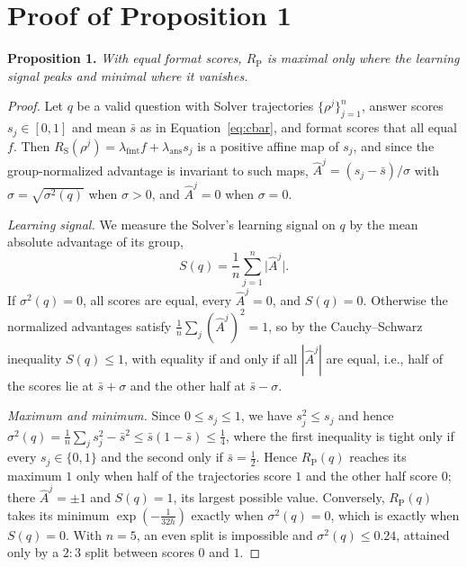 \newcommand{\casebox}[2]{\par\noindent{\setlength{\fboxsep}{1pt}\colorbox{#1}{\parbox{\dimexpr\linewidth-2\fboxsep\relax}{\raggedright\fontsize{6}{6.5}\selectfont #2}}}\par}
\section{Proof of Proposition 1}
\label{app:proof}
\textbf{Proposition 1.} \textit{With equal format scores, $R_{\mathrm{P}}$ is maximal only where the learning signal peaks and minimal where it vanishes.}\vspace{-2mm}
\begin{proof}
Let $q$ be a valid question with Solver trajectories $\{\rho^{j}\}_{j=1}^{n}$, answer scores $s_j\in[0,1]$ and mean $\bar{s}$ as in Equation~\ref{eq:cbar}, and format scores that all equal $f$. Then $R_{\mathrm{S}}(\rho^{j})=\lambda_{\mathrm{fmt}}f+\lambda_{\mathrm{ans}}s_j$ is a positive affine map of $s_j$, and since the group-normalized advantage is invariant to such maps, $\hat{A}^{j}=(s_j-\bar{s})/\sigma$ with $\sigma=\sqrt{\sigma^{2}(q)}$ when $\sigma>0$, and $\hat{A}^{j}=0$ when $\sigma=0$.

\emph{Learning signal.} We measure the Solver's learning signal on $q$ by the mean absolute advantage of its group,
\begin{equation}
\label{eq:signal}
S(q)=\frac1n\sum_{j=1}^{n}\bigl|\hat{A}^{j}\bigr|.
\end{equation}
If $\sigma^{2}(q)=0$, all scores are equal, every $\hat{A}^{j}=0$, and $S(q)=0$. Otherwise the normalized advantages satisfy $\frac1n\sum_{j}(\hat{A}^{j})^{2}=1$, so by the Cauchy--Schwarz inequality $S(q)\le1$, with equality if and only if all $|\hat{A}^{j}|$ are equal, i.e., half of the scores lie at $\bar{s}+\sigma$ and the other half at $\bar{s}-\sigma$.

\emph{Maximum and minimum.} Since $0\le s_j\le1$, we have $s_j^{2}\le s_j$ and hence $\sigma^{2}(q)=\frac1n\sum_{j}s_j^{2}-\bar{s}^{2}\le\bar{s}(1-\bar{s})\le\tfrac14$, where the first inequality is tight only if every $s_j\in\{0,1\}$ and the second only if $\bar{s}=\tfrac12$. Hence $R_{\mathrm{P}}(q)$ reaches its maximum $1$ only when half of the trajectories score $1$ and the other half score $0$; there $\hat{A}^{j}=\pm1$ and $S(q)=1$, its largest possible value. Conversely, $R_{\mathrm{P}}(q)$ takes its minimum $\exp(-\tfrac{1}{32h})$ exactly when $\sigma^{2}(q)=0$, which is exactly when $S(q)=0$. With $n=5$, an even split is impossible and $\sigma^{2}(q)\le0.24$, attained only by a $2{:}3$ split between scores $0$ and $1$.
\end{proof}

